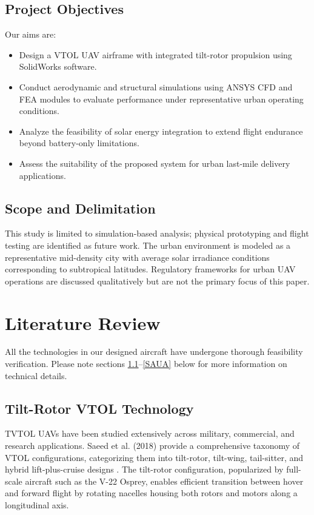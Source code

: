 \documentclass[conference]{IEEEtran}
\begin{document}
\subsection{Project Objectives}
Our aims are:
\begin{itemize}
    \item Design a VTOL UAV airframe with integrated tilt-rotor propulsion using SolidWorks software.
    \item Conduct aerodynamic and structural simulations using ANSYS CFD and FEA modules to evaluate performance under representative urban operating conditions.
    \item Analyze the feasibility of solar energy integration to extend flight endurance beyond battery-only limitations.
    \item Assess the suitability of the proposed system for urban last-mile delivery applications. 
\end{itemize}

\subsection{Scope and Delimitation}
This study is limited to simulation-based analysis; physical prototyping and flight testing are identified as future work. The urban environment is modeled as a representative mid-density city with average solar irradiance conditions corresponding to subtropical latitudes. Regulatory frameworks for urban UAV operations are discussed qualitatively but are not the primary focus of this paper.

\section{Literature Review}
All the technologies in our designed aircraft have undergone thorough feasibility verification. Please note sections \ref{AA}--\ref{SAUA} below for more information on 
technical details.

\subsection{Tilt-Rotor VTOL Technology}\label{AA}
TVTOL UAVs have been studied extensively across military, commercial, and research applications. Saeed et al. (2018) provide a comprehensive taxonomy of VTOL configurations, categorizing them into tilt-rotor, tilt-wing, tail-sitter, and hybrid lift-plus-cruise designs \cite{b5}. The tilt-rotor configuration, popularized by full-scale aircraft such as the V-22 Osprey, enables efficient transition between hover and forward flight by rotating nacelles housing both rotors and motors along a longitudinal axis.
\end{document}
